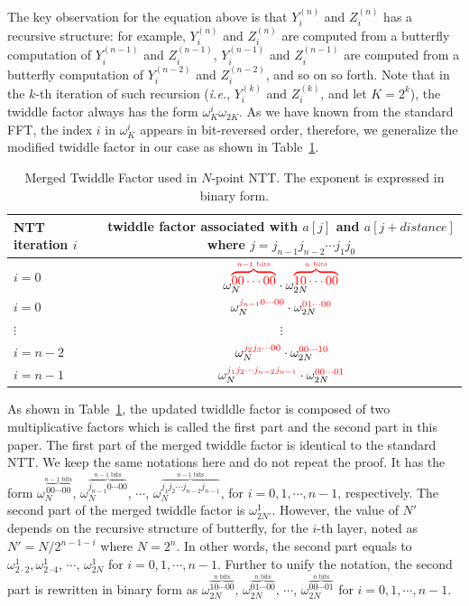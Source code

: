 \documentclass{iacrtrans}
\theoremstyle{plain}
\begin{document}
The key observation for the equation above is that $Y_i^{(n)}$ and $Z_i^{(n)}$ has a recursive structure: for example, $Y_i^{(n)}$ and $Z_i^{(n)}$ are computed from a butterfly computation of  $Y_i^{(n-1)}$ and $Z_i^{(n-1)}$, $Y_i^{(n-1)}$ and $Z_i^{(n-1)}$ are computed from a butterfly computation of $Y_i^{(n-2)}$ and $Z_i^{(n-2)}$, and so on so forth. Note that in the $k$-th iteration of such recursion (\textit{i.e.}, $Y_i^{(k)}$ and $Z_i^{(k)}$, and let $K=2^k$), the twiddle factor always has the form $\omega_K^i\omega_{2K}$. As we have known from the standard FFT, the index $i$ in $\omega_K^i$ appears in bit-reversed order, therefore, we generalize the modified twiddle factor in our case as shown in Table~\ref{table:merged_tf}.
\begin{table}\centering
\begin{tabular}{lc}
 \hline
 NTT iteration $i$ & \makecell{twiddle factor associated with $a[j]$ and\\ $a[j+distance]$ where $j=j_{n-1}j_{n-2}\cdots j_{1}j_{0}$}\\
 \hline
 $i=0$ & $\omega_{N}^{\textcolor{red}{\overbrace{00\cdots00}^{n-1 \text{ bits}}}}\cdot \omega_{2N}^{\textcolor{red}{\overbrace{10\cdots00}^{n \text{ bits}}}}$\\
 $i=0$ & $\omega_{N}^{\textcolor{red}{j_{n-1}0\cdots 00}}\cdot\omega_{2N}^{\textcolor{red}{01\cdots 00}}$ \\
 $\vdots$ & $\vdots$ \\
 $i=n-2$ & $\omega_{N}^{\textcolor{red}{j_{2}j_{3}\cdots 00}}\cdot \omega_{2N}^{\textcolor{red}{00\cdots 10}}$\\
 $i=n-1$ & $\omega_{N}^{\textcolor{red}{j_{1}j_{2}\cdots j_{n-2}j_{n-1}}}\cdot \omega_{2N}^{\textcolor{red}{00\cdots 01}}$\\
 \hline
 \end{tabular}

   \caption{Merged Twiddle Factor used in $N$-point NTT. The exponent is expressed in binary form.}
  \label{table:merged_tf}
 \end{table}

 As shown in Table~\ref{table:merged_tf}, the updated twidldle factor is composed of two multiplicative factors which is called the first part and the second part in this paper. The first part of the merged twiddle factor is identical to the standard NTT. We keep the same notations here and do not repeat the proof. It has the form $\omega_{N}^{\overbrace{00\cdots 00}^{n-1 \text{ bits}}}$, $\omega_{N}^{\overbrace{j_{n-1}0\cdots 00}^{n-1 \text{ bits}}}$, $\cdots$, $\omega_{N}^{\overbrace{j_1j_2\cdots j_{n-2}j_{n-1}}^{n-1 \text{ bits}}}$, for $i=0,1,\cdots,n-1$, respectively.
The second part of the merged twiddle factor is $\omega_{2N'}^1$. However, the value of $N'$ depends on the recursive structure of butterfly, for the $i$-th layer, noted as $N'=N/2^{n-1-i}$ where $N=2^n$. In other words, the second part equals to $\omega_{2\cdot 2}^1, \omega_{2\cdot 4}^1$, $\cdots$, $\omega_{2N}^1$ for $i=0,1,\cdots,n-1$. Further to unify the notation, the second part is rewritten in binary form as $\omega_{2N}^{\overbrace{10\cdots 00}^{n\text{ bits}}}$, $\omega_{2N}^{\overbrace{01\cdots 00}^{n\text{ bits}}}$, $\cdots$, $\omega_{2N}^{\overbrace{00\cdots 01}^{n\text{ bits}}}$ for $i=0,1,\cdots,n-1$.
\end{document}
